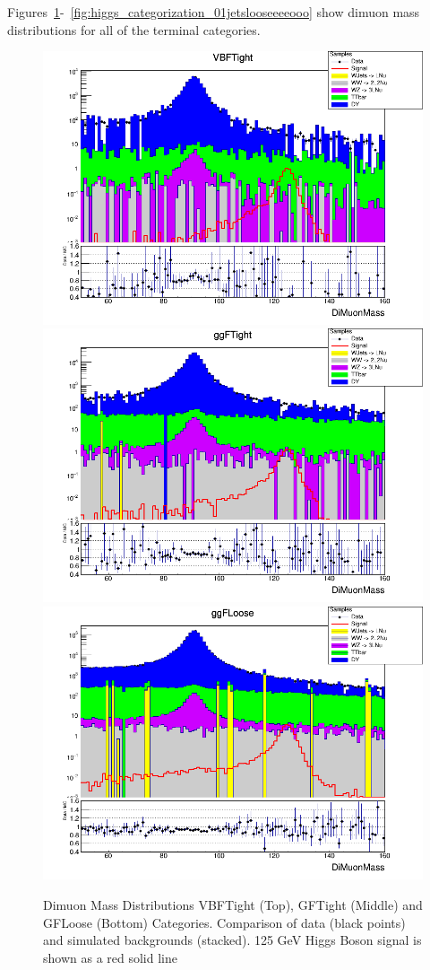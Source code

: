 Figures~\ref{fig:higgs_categorization_2jetsall}-~\ref{fig:higgs_categorization_01jetslooseeeeooo} show dimuon mass distributions for all of the terminal categories.
\begin{figure}[htbp]
  \centering
  \includegraphics[width=0.65\linewidth]{figures/ch_higgs/distributions/baseline_kalman/distribution__VBFTight__DiMuonMass__logY.png}\\
  \includegraphics[width=0.65\linewidth]{figures/ch_higgs/distributions/baseline_kalman/distribution__ggFTight__DiMuonMass__logY.png}\\
  \includegraphics[width=0.65\linewidth]{figures/ch_higgs/distributions/baseline_kalman/distribution__ggFLoose__DiMuonMass__logY.png}
  \caption{Dimuon Mass Distributions VBFTight (Top), GFTight (Middle) and GFLoose (Bottom) Categories. Comparison of data (black points) and simulated backgrounds (stacked). 125 GeV Higgs Boson signal is shown as a red solid line}
  \label{fig:higgs_categorization_2jetsall}
\end{figure}
